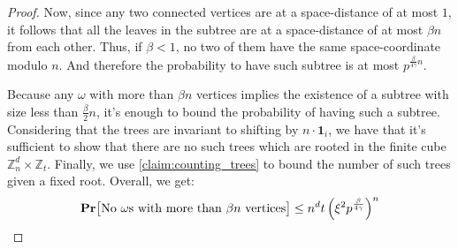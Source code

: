 
  \begin{proof}
  Now, since any two connected vertices are at a space-distance of at most $1$, it follows that all the leaves in the subtree are at a space-distance of at most $\beta n$ from each other. Thus, if $\beta < 1$, no two of them have the same space-coordinate modulo $n$. And therefore the probability to have such subtree is at most $p^{\frac{\beta}{4\gamma}n} $. 
  
Because any $\omega$ with more than $\beta n$ vertices implies the existence of a subtree with size less than $\frac{\beta}{2}n$, it's enough to bound the probability of having such a subtree. Considering that the trees are invariant to shifting by $n \cdot \mathbf{1}_{i}$, we have that it's sufficient to show that there are no such trees which are rooted in the finite cube $\mathbb{Z}_{n}^{d} \times \mathbb{Z}_{t}$. Finally, we use \cref{claim:counting_trees} to bound the number of such trees given a fixed root. Overall, we get:
  \begin{equation*}
    \begin{split}
      \mathbf{Pr} \big[ \text{No } \omega \text{s with more than  } \beta n \text{ vertices}  \big] \le n^{d} t  \left( \xi^{2}  p^{\frac{\beta}{4\gamma}} \right)^{n}   
    \end{split}
  \end{equation*}
\end{proof}


